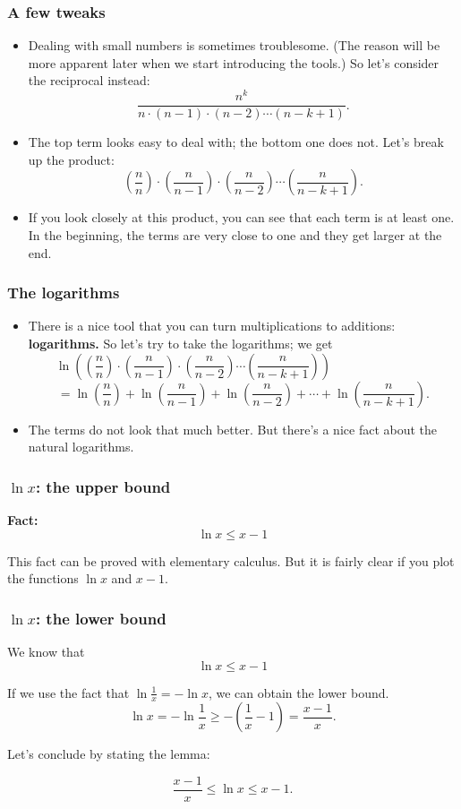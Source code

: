 \begin{frame}\frametitle{A few tweaks}
  \begin{itemize}
  \item Dealing with small numbers is sometimes troublesome. (The
    reason will be more apparent later when we start introducing the
    tools.)  So let's consider the reciprocal instead:
    \[\frac{n^k}{n\cdot (n-1)\cdot (n-2)\cdots (n-k+1)}.\]
    \pause
  \item The top term looks easy to deal with; the bottom one does not.
    Let's break up the product:
    \[\left(\frac{n}{n}\right)\cdot
    \left(\frac{n}{n-1}\right)\cdot\left(\frac{n}{n-2}\right)
    \cdots\left(\frac{n}{n-k+1}\right).\]
    \pause
  \item If you look closely at this product, you can see that each
    term is at least one.  In the beginning, the terms are very close
    to one and they get larger at the end.
  \end{itemize}
\end{frame}

\begin{frame}\frametitle{The logarithms}
  \begin{itemize}
  \item There is a nice tool that you can turn multiplications to
    additions: {\bf logarithms.}  So let's try to take the logarithms; \pause
    we get
    \[\ln\left(\left(\frac{n}{n}\right)\cdot
    \left(\frac{n}{n-1}\right)\cdot\left(\frac{n}{n-2}\right)
    \cdots\left(\frac{n}{n-k+1}\right)\right) \qquad \qquad \qquad \qquad \]
    \[ = \ln\left(\frac{n}{n}\right)+
    \ln\left(\frac{n}{n-1}\right)+\ln\left(\frac{n}{n-2}\right) +
    \cdots+\ln\left(\frac{n}{n-k+1}\right).\]
    \pause
  \item The terms do not look that much better.  But there's a nice
    fact about the natural logarithms.
  \end{itemize}
\end{frame}

\begin{frame}\frametitle{$\ln x$: the upper bound}
  \begin{tcolorbox}
    {\bf Fact:}
    \[\ln x \leq x - 1\]
  \end{tcolorbox}
  This fact can be proved with elementary calculus.  But it is fairly clear if you plot the functions $\ln x$ and $x-1$.
  \vspace{1.2in}
\end{frame}

\begin{frame}\frametitle{$\ln x$: the lower bound}
  We know that
  \[ \ln x \leq x - 1 \]
  
  If we use the fact that $\ln\frac{1}{x}=-\ln x$, we can obtain the
  lower bound.
  \[ \ln x = -\ln\frac{1}{x}\geq -\left(\frac{1}{x}-1\right)=\frac{x-1}{x}. \]

  \pause
  Let's conclude by stating the lemma:
  \begin{tcolorbox}
    \begin{lemma}
      \[\frac{x-1}{x}\leq \ln x\leq x-1.\]
    \end{lemma}
  \end{tcolorbox}
\end{frame}

